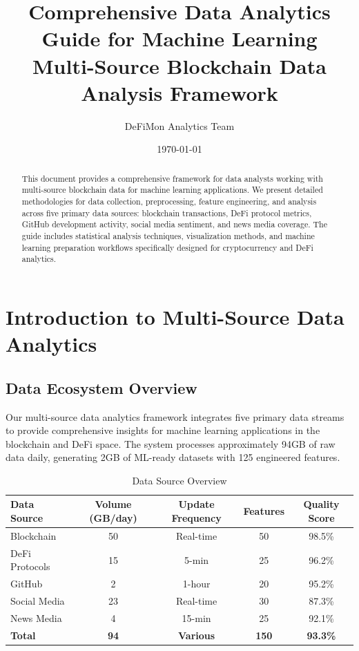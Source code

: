\documentclass[12pt,a4paper]{article}
\begin{document}
\title{\Huge\textbf{Comprehensive Data Analytics Guide for Machine Learning}\\
\Large Multi-Source Blockchain Data Analysis Framework}
\author{DeFiMon Analytics Team}
\date{\today}

\maketitle

\begin{abstract}
This document provides a comprehensive framework for data analysts working with multi-source blockchain data for machine learning applications. We present detailed methodologies for data collection, preprocessing, feature engineering, and analysis across five primary data sources: blockchain transactions, DeFi protocol metrics, GitHub development activity, social media sentiment, and news media coverage. The guide includes statistical analysis techniques, visualization methods, and machine learning preparation workflows specifically designed for cryptocurrency and DeFi analytics.
\end{abstract}

\tableofcontents
\newpage

\section{Introduction to Multi-Source Data Analytics}

\subsection{Data Ecosystem Overview}

Our multi-source data analytics framework integrates five primary data streams to provide comprehensive insights for machine learning applications in the blockchain and DeFi space. The system processes approximately 94GB of raw data daily, generating 2GB of ML-ready datasets with 125 engineered features.

\begin{table}[h]
\centering
\caption{Data Source Overview}
\begin{tabular}{|l|c|c|c|c|}
\hline
\textbf{Data Source} & \textbf{Volume (GB/day)} & \textbf{Update Frequency} & \textbf{Features} & \textbf{Quality Score} \\
\hline
Blockchain & 50 & Real-time & 50 & 98.5\% \\
DeFi Protocols & 15 & 5-min & 25 & 96.2\% \\
GitHub & 2 & 1-hour & 20 & 95.2\% \\
Social Media & 23 & Real-time & 30 & 87.3\% \\
News Media & 4 & 15-min & 25 & 92.1\% \\
\hline
\textbf{Total} & \textbf{94} & \textbf{Various} & \textbf{150} & \textbf{93.3\%} \\
\hline
\end{tabular}
\end{table}
\end{document}
